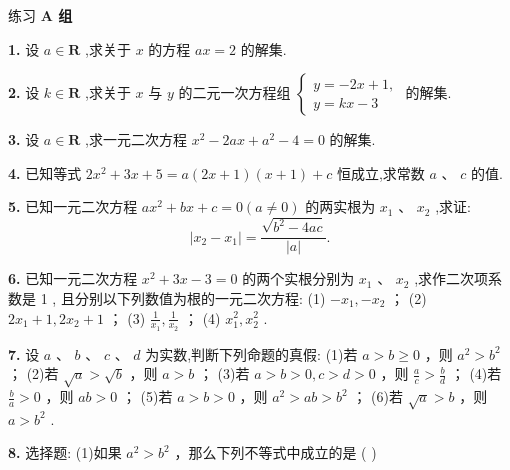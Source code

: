 \documentclass[a4paper,10pt,oneside,fontset=none]{ctexbook}
\renewcommand{\geq}{\geqslant}
\newenvironment{exercise}[1][]{\begin{exBox}{练习}{#1}}{\end{exBox}}
\numberwithin{equation}{chapter}
\begin{document}
\begin{exercise}
\textbf{A 组}\par\vspace{0.5em}
\textbf{1.} 设 $a \in  \mathbf{R}$ ,求关于 $x$ 的方程 ${ax} = 2$ 的解集.
\par\vspace{0.8em}
\textbf{2.} 设 $k \in  \mathbf{R}$ ,求关于 $x$ 与 $y$ 的二元一次方程组 $\left\{  \begin{array}{l} y =  - {2x} + 1, \\  y = {kx} - 3 \end{array}\right.$ 的解集.
\par\vspace{0.8em}
\textbf{3.} 设 $a \in  \mathbf{R}$ ,求一元二次方程 ${x}^{2} - {2ax} + {a}^{2} - 4 = 0$ 的解集.
\par\vspace{0.8em}
\textbf{4.} 已知等式 $2{x}^{2} + {3x} + 5 = a\left( {{2x} + 1}\right) \left( {x + 1}\right)  + c$ 恒成立,求常数 $a\text{ 、 }c$ 的值.
\par\vspace{0.8em}
\textbf{5.} 已知一元二次方程 $a{x}^{2} + {bx} + c = 0\left( {a \neq  0}\right)$ 的两实根为 ${x}_{1}\text{ 、 }{x}_{2}$ ,求证: $$
\left| {{x}_{2} - {x}_{1}}\right|  = \frac{\sqrt{{b}^{2} - {4ac}}}{\left| a\right| }.
$$
\par\vspace{0.8em}
\textbf{6.} 已知一元二次方程 ${x}^{2} + {3x} - 3 = 0$ 的两个实根分别为 ${x}_{1}\text{ 、 }{x}_{2}$ ,求作二次项系数是 1 , 且分别以下列数值为根的一元二次方程: (1) $- {x}_{1}, - {x}_{2}$ ； (2) $2{x}_{1} + 1,2{x}_{2} + 1$ ； (3) $\frac{1}{{x}_{1}},\frac{1}{{x}_{2}}$ ； (4) ${x}_{1}^{2},{x}_{2}^{2}$ .
\par\vspace{0.8em}
\textbf{7.} 设 $a\text{ 、 }b\text{ 、 }c\text{ 、 }d$ 为实数,判断下列命题的真假: (1)若 $a > b \geq  0$ ，则 ${a}^{2} > {b}^{2}$ ； (2)若 $\sqrt{a} > \sqrt{b}$ ，则 $a > b$ ； (3)若 $a > b > 0, c > d > 0$ ，则 $\frac{a}{c} > \frac{b}{d}$ ； (4)若 $\frac{b}{a} > 0$ ，则 ${ab} > 0$ ； (5)若 $a > b > 0$ ，则 ${a}^{2} > {ab} > {b}^{2}$ ； (6)若 $\sqrt{a} > b$ ，则 $a > {b}^{2}$ .
\par\vspace{0.8em}
\textbf{8.} 选择题: (1)如果 ${a}^{2} > {b}^{2}$ ，那么下列不等式中成立的是 ( )
\par\vspace{0.3em}
\begin{center}
\begin{tabular}{@{}p{}p{}@{}}

\end{tabular}
\end{center}
\end{exercise}
\end{document}
